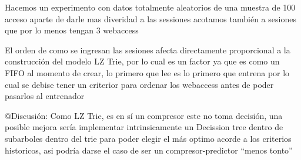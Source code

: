 




Hacemos un experimento con datos totalmente aleatorios de una muestra de 100 acceso
aparte de darle mas diveridad a las sessiones acotamos también a sesiones que por lo menos tengan
3 webaccess 




El orden de como se ingresan las sesiones afecta directamente proporcional a la construcción del modelo LZ Trie,
por lo cual es un factor ya que es como un FIFO al momento de crear, lo primero que lee es lo primero que entrena
por lo cual se debise tener un criterior para ordenar los webaccess antes de poder pasarlos al entrenador

@Discusión: Como LZ Trie, es en sí un compresor este no toma decisión, una posible mejora
sería implementar intrinsicamente un Decission tree dentro de subarboles dentro del trie para
poder elegir el más optimo acorde a los criterios historicos, asi podría darse el caso de ser
un compresor-predictor  ``menos tonto''


